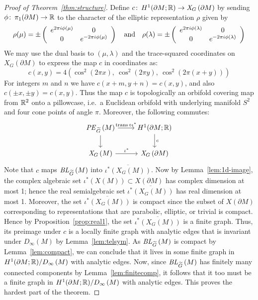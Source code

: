 \documentclass[tikz, sepfignums, defaultenums]{nmd/article}
\newcommand{\PSLRcharvar}[1]{\mathit{X}_{G}\left(#1\right)}
\newcommand{\XG}[1]{\mathit{X}_{G}\left(#1\right)}
\newcommand{\RGtilPE}[1]{\mathit{PE}_{\Gtil}\left(#1\right)}
\newcommand{\inc}{\iota}
\DeclareMathOperator{\trans}{trans}
\newcommand{\SymTEL}[1]{D_\infty\left(#1\right)}
\newcommand{\TELquo}[1]{\mathit{BL}_\Gtil\left(#1\right)}
\begin{document}
\begin{proof}[Proof of Theorem~\ref{thm:structure}] 

Define $c \maps H^1(\partial M; \R) \to \PSLRcharvar{\partial M}$ by
sending $\phi \colon\thinspace \pi_1(\partial M) \to {\mathbb R}$ to the character of
the elliptic representation $\rho$ given by 
\[
\rho(\mu) = \pm\left(\begin{array}{cc} e^{2\pi i \phi(\mu)} & 0 \\ 0 & e^{-2\pi i
    \phi(\mu)} \end{array}\right)
\quad \mbox{and} \quad
\rho(\lambda) = \pm\left(\begin{array}{cc} e^{2 \pi
    i\phi(\lambda)} & 0 \\ 0 & e^{- 2\pi i\phi(\lambda)} \end{array}\right)
\]
We may use the dual basis to $(\mu, \lambda)$ and the trace-squared
coordinates on $\PSLRcharvar{\partial M}$ to express the map $c$ in
coordinates as:
\[
c(x, y) = 4\left(\cos^2( 2 \pi x), \ \cos^2( 2 \pi y), \ \cos^2\left(2\pi(x + y)\right)\right)
\]
For integers $m$ and $n$ we have $c(x+m, y+n) = c(x, y)$, and also
$c(\pm x, \pm y) = c(x, y)$.  Thus the map $c$ is topologically an
orbifold covering map from ${\mathbb R}^2$ onto a pillowcase, i.e.~a Euclidean
orbifold with underlying manifold $S^2$ and four cone points of angle
$\pi$.  Moreover, the following commutes:
\[
\begin{tikzcd}
  \RGtilPE{M} \arrow{r}{\trans\circ\inc^*} \arrow{d}
    & H^1(\partial M; \R) \arrow{d}{c} \\
  \PSLRcharvar{M} \arrow{r}{\inc^*} & \PSLRcharvar{\partial M}
\end{tikzcd}
\]
Note that $c$ maps $\TELquo{M}$ into
$\overline{\inc^*\left(\XG{M}\right)}$.  Now by
Lemma~\ref{lem:1d-image}, the complex algebraic set
$\inc^*\left(X(M)\right) \subset X(\partial M)$ has complex dimension
at most 1; hence the real semialgebraic set
$\overline{\inc^*\left(\XG{M}\right)}$ has real dimension at most 1.
Moreover, the set $\overline{\inc^*\left(\XG{M}\right)}$ is compact
since the subset of $X(\partial M)$ corresponding to representations
that are parabolic, elliptic, or trivial is compact.  Hence by
Proposition~\ref{prop:real1}, the set
$\overline{\inc^*\left(\XG{M}\right)}$ is a finite graph.  Thus, its
preimage under $c$ is a locally finite graph with analytic edges that
is invariant under $\SymTEL{M}$ by Lemma~\ref{lem:telsym}.  As
$\TELquo{M}$ is compact by Lemma~\ref{lem:compact}, we can conclude
that it lives in some finite graph in $H^1(\partial M; \R)/\SymTEL{M}$
with analytic edges.  Now, since $\TELquo{M}$ has finitely many
connected components by Lemma~\ref{lem:finitecomp}, it follows that it
too must be a finite graph in $H^1(\partial M; \R)/\SymTEL{M}$ with
analytic edges.  This proves the hardest part of the theorem.


\end{proof}
\end{document}
